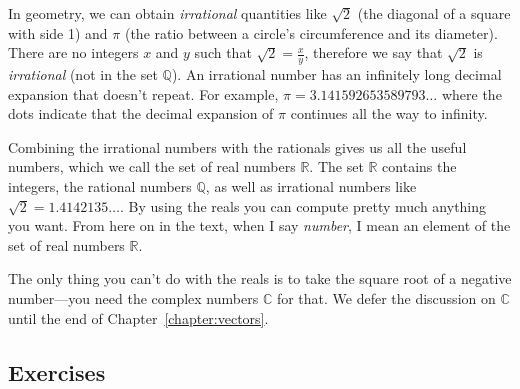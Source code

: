 		In geometry, we can obtain \emph{irrational} quantities like $\sqrt{2}$ (the diagonal of a square with side 1)
		and $\pi$ (the ratio between a circle's circumference and its diameter).
		There are no integers $x$ and $y$ such that $\sqrt{2}=\frac{x}{y}$,
		therefore we say that $\sqrt{2}$ is \emph{irrational} (not in the set $\mathbb{Q}$).
		An irrational number has an infinitely long decimal expansion that doesn't repeat.
		For example, $\pi = 3.141592653589793\ldots$ where the dots indicate
		that the decimal expansion of $\pi$ continues all the way to infinity.

		Combining the irrational numbers with the rationals gives us all the useful numbers,
		which we call the set of real numbers $\mathbb{R}$.
		The set $\mathbb{R}$ contains the integers,
		the rational numbers $\mathbb{Q}$,
		as well as irrational numbers like $\sqrt{2}=1.4142135\ldots$.
		By using the reals you can compute pretty much anything you want.
		From here on in the text, when I say \emph{number},
		I mean an element of the set of real numbers $\mathbb{R}$.

		The only thing you can't do with the reals is to take the square root of a negative number---you 							
		need the complex numbers $\mathbb{C}$ for that.
		We defer the discussion on $\mathbb{C}$ until the end of Chapter~\ref{chapter:vectors}.


	\subsection{Exercises}
	\label{numbers:exercises}
	
		
	

